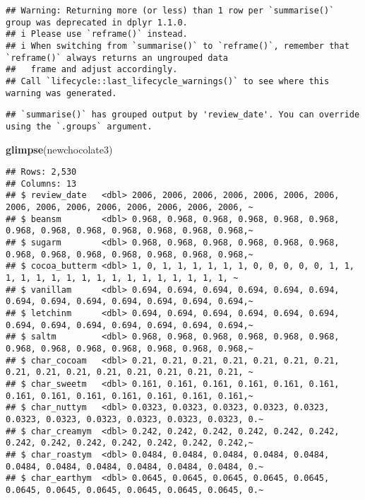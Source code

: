 \documentclass[
]{article}
\newenvironment{Shaded}{\begin{snugshade}}{\end{snugshade}}
\newcommand{\FunctionTok}[1]{\textcolor[rgb]{0.13,0.29,0.53}{\textbf{#1}}}
\newcommand{\NormalTok}[1]{#1}
\begin{document}
\begin{verbatim}
## Warning: Returning more (or less) than 1 row per `summarise()` group was deprecated in dplyr 1.1.0.
## i Please use `reframe()` instead.
## i When switching from `summarise()` to `reframe()`, remember that `reframe()` always returns an ungrouped data
##   frame and adjust accordingly.
## Call `lifecycle::last_lifecycle_warnings()` to see where this warning was generated.
\end{verbatim}

\begin{verbatim}
## `summarise()` has grouped output by 'review_date'. You can override using the `.groups` argument.
\end{verbatim}

\begin{Shaded}
\begin{Highlighting}[]
\FunctionTok{glimpse}\NormalTok{(newchocolate3)}
\end{Highlighting}
\end{Shaded}

\begin{verbatim}
## Rows: 2,530
## Columns: 13
## $ review_date   <dbl> 2006, 2006, 2006, 2006, 2006, 2006, 2006, 2006, 2006, 2006, 2006, 2006, 2006, 2006, 2006, ~
## $ beansm        <dbl> 0.968, 0.968, 0.968, 0.968, 0.968, 0.968, 0.968, 0.968, 0.968, 0.968, 0.968, 0.968, 0.968,~
## $ sugarm        <dbl> 0.968, 0.968, 0.968, 0.968, 0.968, 0.968, 0.968, 0.968, 0.968, 0.968, 0.968, 0.968, 0.968,~
## $ cocoa_butterm <dbl> 1, 0, 1, 1, 1, 1, 1, 1, 0, 0, 0, 0, 0, 1, 1, 1, 1, 1, 1, 1, 1, 1, 1, 1, 1, 1, 1, 1, 1, 1, ~
## $ vanillam      <dbl> 0.694, 0.694, 0.694, 0.694, 0.694, 0.694, 0.694, 0.694, 0.694, 0.694, 0.694, 0.694, 0.694,~
## $ letchinm      <dbl> 0.694, 0.694, 0.694, 0.694, 0.694, 0.694, 0.694, 0.694, 0.694, 0.694, 0.694, 0.694, 0.694,~
## $ saltm         <dbl> 0.968, 0.968, 0.968, 0.968, 0.968, 0.968, 0.968, 0.968, 0.968, 0.968, 0.968, 0.968, 0.968,~
## $ char_cocoam   <dbl> 0.21, 0.21, 0.21, 0.21, 0.21, 0.21, 0.21, 0.21, 0.21, 0.21, 0.21, 0.21, 0.21, 0.21, 0.21, ~
## $ char_sweetm   <dbl> 0.161, 0.161, 0.161, 0.161, 0.161, 0.161, 0.161, 0.161, 0.161, 0.161, 0.161, 0.161, 0.161,~
## $ char_nuttym   <dbl> 0.0323, 0.0323, 0.0323, 0.0323, 0.0323, 0.0323, 0.0323, 0.0323, 0.0323, 0.0323, 0.0323, 0.~
## $ char_creamym  <dbl> 0.242, 0.242, 0.242, 0.242, 0.242, 0.242, 0.242, 0.242, 0.242, 0.242, 0.242, 0.242, 0.242,~
## $ char_roastym  <dbl> 0.0484, 0.0484, 0.0484, 0.0484, 0.0484, 0.0484, 0.0484, 0.0484, 0.0484, 0.0484, 0.0484, 0.~
## $ char_earthym  <dbl> 0.0645, 0.0645, 0.0645, 0.0645, 0.0645, 0.0645, 0.0645, 0.0645, 0.0645, 0.0645, 0.0645, 0.~
\end{verbatim}
\end{document}
